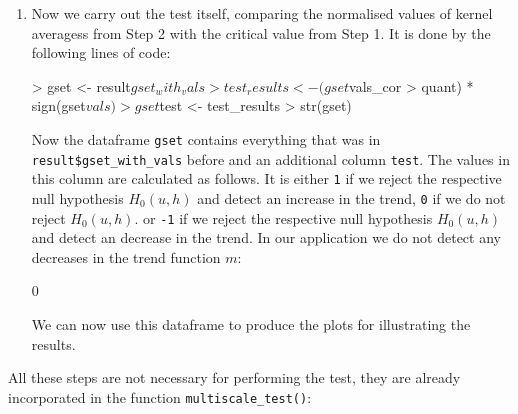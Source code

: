 \documentclass[a4paper]{scrartcl}
\begin{document}
\begin{enumerate}[label=\textit{Step \arabic*.}, leftmargin=1.45cm]
\item Now we carry out the test itself, comparing the normalised values of kernel averagess from Step 2 with the critical value from Step 1. It is done by the following lines of code:
\begin{Schunk}
\begin{Sinput}
> gset         <- result$gset_with_vals
> test_results <- (gset$vals_cor > quant) * sign(gset$vals)
> gset$test    <- test_results
> str(gset)
\end{Sinput}
\end{Schunk}

Now the dataframe \verb|gset| contains everything that was in \verb|result$gset_with_vals| before and an additional column \verb|test|. The values in this column are calculated as follows. It is either \verb|1| if we reject the respective null hypothesis $H_0(u, h)$ and detect an increase in the trend, \verb|0| if we do not reject $H_0(u, h)$. or \verb|-1| if we reject the respective null hypothesis $H_0(u, h)$ and detect an decrease in the trend. In our application we do not detect any decreases in the trend function $m$:

\begin{Schunk}
\begin{Soutput}
[1] 0
\end{Soutput}
\end{Schunk}


We can now use this dataframe to produce the plots for illustrating the results.
\end{enumerate}

All these steps are not necessary for performing the test, they are already incorporated in the function \verb|multiscale_test()|:
\end{document}
